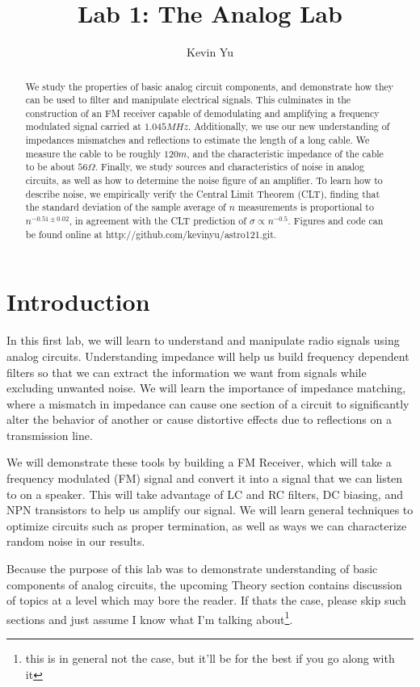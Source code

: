 \documentclass[12pt]{article}
\title{Lab 1: The Analog Lab}
\author {
Kevin Yu
}
\begin{document}
\maketitle

\begin{abstract}
We study the properties of basic analog circuit components, and demonstrate how they can be used to filter and manipulate electrical signals. This culminates in the construction of an FM receiver capable of demodulating and amplifying a frequency modulated signal carried at $1.045MHz$. Additionally, we use our new understanding of impedances mismatches and reflections to estimate the length of a long cable. We measure the cable to be roughly $120m$, and the characteristic impedance of the cable to be about $56\Omega$. Finally, we study sources and characteristics of noise in analog circuits, as well as how to determine the noise figure of an amplifier. To learn how to describe noise, we empirically verify the Central Limit Theorem (CLT), finding that the standard deviation of the sample average of $n$ measurements is proportional to $n^{-0.51\pm0.02}$, in agreement with the CLT prediction of $\sigma \propto n^{-0.5}$. Figures and code can be found online at http://github.com/kevinyu/astro121.git.
\end{abstract}

\section*{Introduction}
In this first lab, we will learn to understand and manipulate radio signals using analog circuits. Understanding impedance will help us build frequency dependent filters so that we can extract the information we want from signals while excluding unwanted noise. We will learn the importance of impedance matching, where a mismatch in impedance can cause one section of a circuit to significantly alter the behavior of another or cause distortive effects due to reflections on a transmission line.

We will demonstrate these tools by building a FM Receiver, which will take a frequency modulated (FM) signal and convert it into a signal that we can listen to on a speaker. This will take advantage of LC and RC filters, DC biasing, and NPN transistors to help us amplify our signal. We will learn general techniques to optimize circuits such as proper termination, as well as ways we can characterize random noise in our results.

Because the purpose of this lab was to demonstrate understanding of basic components of analog circuits, the upcoming Theory section contains discussion of topics at a level which may bore the reader. If thats the case, please skip such sections and just assume I know what I'm talking about\footnote{this is in general not the case, but it'll be for the best if you go along with it}.
\end{document}
